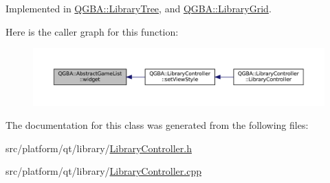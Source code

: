 Implemented in \mbox{\hyperlink{class_q_g_b_a_1_1_library_tree_ad626b8a7235cd5e88876391a85d0ca3f}{Q\+G\+B\+A\+::\+Library\+Tree}}, and \mbox{\hyperlink{class_q_g_b_a_1_1_library_grid_ad2502591d78d5f1dcef0e68ecece6fa1}{Q\+G\+B\+A\+::\+Library\+Grid}}.

Here is the caller graph for this function\+:
\nopagebreak
\begin{figure}[H]
\begin{center}
\leavevmode
\includegraphics[width=350pt]{class_q_g_b_a_1_1_abstract_game_list_a1854b55a36d86e0695146872d37d19d2_icgraph}
\end{center}
\end{figure}


The documentation for this class was generated from the following files\+:\begin{DoxyCompactItemize}
\item 
src/platform/qt/library/\mbox{\hyperlink{_library_controller_8h}{Library\+Controller.\+h}}\item 
src/platform/qt/library/\mbox{\hyperlink{_library_controller_8cpp}{Library\+Controller.\+cpp}}\end{DoxyCompactItemize}

